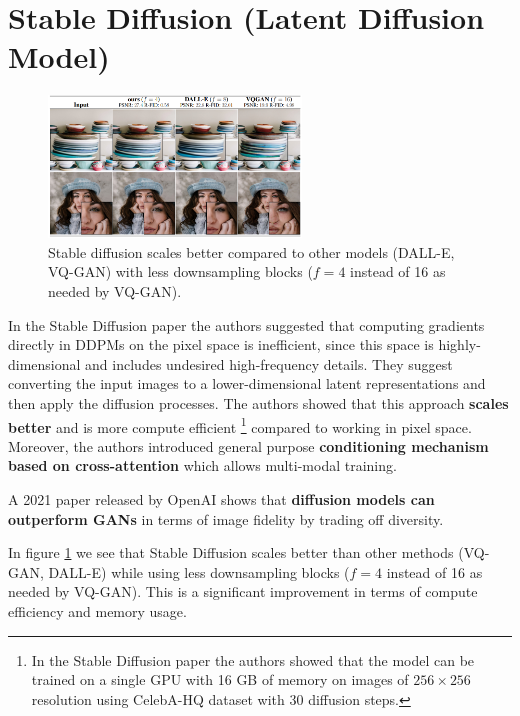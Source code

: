 \section{Stable Diffusion (Latent Diffusion Model)}
\label{sec:stable_diffusion}


\begin{figure}
    \centering
    \includegraphics[width=0.6\textwidth]{images/diffusion_models/stable_diffusion/stable_diffusion.png}
    \caption{Stable diffusion scales better compared to other models \cite{stable_diffusion} (DALL-E, VQ-GAN) with less downsampling blocks ($f = 4$ instead of 16 as needed by VQ-GAN).}
    \label{fig:stable_diffusion_less_downsampling_blocks}
\end{figure}


In the Stable Diffusion paper \cite{stable_diffusion} the authors suggested that computing gradients directly in DDPMs on the pixel space is inefficient, since this space is highly-dimensional and includes undesired high-frequency details. They suggest converting the input images to a lower-dimensional latent representations and then apply the diffusion processes. The authors showed that this approach \textbf{scales better} and is more compute efficient \footnote{In the Stable Diffusion paper \cite{stable_diffusion} the authors showed that the model can be trained on a single GPU with 16 GB of memory on images of $256\times 256$ resolution using CelebA-HQ dataset with 30 diffusion steps.} compared to working in pixel space. Moreover, the authors introduced general purpose \textbf{conditioning mechanism based on cross-attention} which allows multi-modal training.

A 2021 paper released by OpenAI \cite{openai_diffusion_beats_gans} shows that \textbf{diffusion models can outperform GANs} in terms of image fidelity by trading off diversity.

In figure \ref{fig:stable_diffusion_less_downsampling_blocks} we see that Stable Diffusion scales better than other methods (VQ-GAN, DALL-E) while using less downsampling blocks ($f = 4$ instead of 16 as needed by VQ-GAN). This is a significant improvement in terms of compute efficiency and memory usage.










